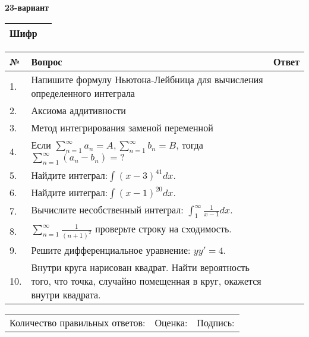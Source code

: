 \documentclass{article}
\begin{document}
  \egroup
  
  \newpage
  
  
  \textbf{23-вариант}\\
  
  \bgroup
  \def\arraystretch{1.6} %
  
  \begin{tabular}{|m{5.7cm}|m{9.5cm}|}
  \hline
  Шифр & \\
  \hline
  \end{tabular}
  
  \vspace{1cm}
  
  \begin{tabular}{|m{0.7cm}|m{10cm}|m{4cm}|}
  \hline
  № & Вопрос & Ответ \\
  \hline
  1. & Напишите формулу Ньютона-Лейбница для вычисления определенного интеграла &  \\
  \hline
  2. & Аксиома аддитивности &  \\
  \hline
  3. & Метод интегрирования заменой переменной &  \\
  \hline
  4. & Если \(\sum_{n = 1}^{\infty}a_{n} = A,\sum_{n = 1}^{\infty}b_{n} = B\), тогда \(\sum_{n = 1}^{\infty}\left( a_{n} - b_{n} \right) = ?\) &  \\
  \hline
  5. & Найдите интеграл:\(\int{(x - 3)^{41}}dx\). &  \\
  \hline
  6. & Найдите интеграл:\(\int{(x - 1)^{20}}dx\). &  \\
  \hline
  7. & Вычислите несобственный интеграл: \(\int_{1}^{\infty}{\frac{1}{x - 1}dx}\). &  \\
  \hline
  8. & \(\sum_{n = 1}^{\infty}\frac{1}{(n + 1)^{2}}\) проверьте строку на сxодимость. &  \\
  \hline
  9. & Решите дифференциальное уравнение: \(yy' = 4\). &  \\
  \hline
  10. & Внутри круга нарисован квадрат. Найти вероятность того, что точка, случайно помещенная в круг, окажется внутри квадрата. &  \\
  \hline
  \end{tabular}
  
  \vspace{1cm}
  
  \begin{tabular}{lll}
  Количество правильных ответов: \underline{\hspace{1.5cm}} & 
  Оценка: \underline{\hspace{1.5cm}} & 
  Подпись: \underline{\hspace{2cm}} \\
  \end{tabular}
  
\end{document}

